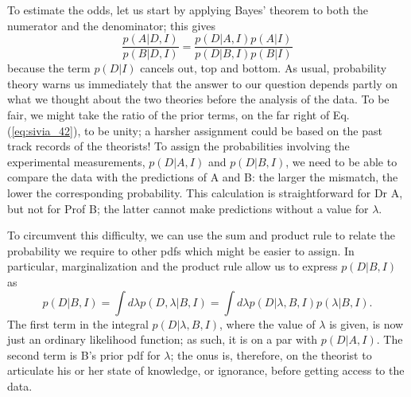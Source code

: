\documentclass[%
oneside,                 %
final,                   %
10pt]{article}
\begin{document}
To estimate the odds, let us start by applying Bayes’ theorem to both the numerator and the denominator; this gives
\begin{equation}
\frac{p(A|D,I)}{p(B|D,I)} = \frac{p(D|A,I) p(A|I)}{p(D|B,I) p(B|I)}
\label{eq:sivia_42}
\end{equation}
because the term $p(D|I)$ cancels out, top and bottom. As usual, probability theory warns us immediately that the answer to our question depends partly on what we thought about the two theories before the analysis of the data. To be fair, we might take the ratio of the prior terms, on the far right of Eq. (\ref{eq:sivia_42}), to be unity; a harsher assignment could be based on the past track records of the theorists! To assign the probabilities involving the experimental measurements, $p(D|A,I)$ and $p(D|B,I)$, we need to be able to compare the data with the predictions of A and B: the larger the mismatch, the lower the corresponding probability. This calculation is straightforward for Dr A, but not for Prof B; the latter cannot make predictions without a value for $\lambda$.

To circumvent this difficulty, we can use the sum and product rule to relate the probability we require to other pdfs which might be easier to assign. In particular, marginalization and the product rule allow us to express $p(D | B , I )$ as
\begin{equation}
p(D|B,I) = \int d\lambda p(D,\lambda|B,I) = 
\int d\lambda p(D|\lambda,B,I) p(\lambda|B,I). 
\label{eq:sivia_43}
\end{equation}
The first term in the integral $p(D | \lambda, B , I )$, where the value of $\lambda$ is given, is now just an ordinary likelihood function; as such, it is on a par with $p(D|A,I)$. The second term is B’s prior pdf for $\lambda$; the onus is, therefore, on the theorist to articulate his or her state of knowledge, or ignorance, before getting access to the data.
\end{document}
